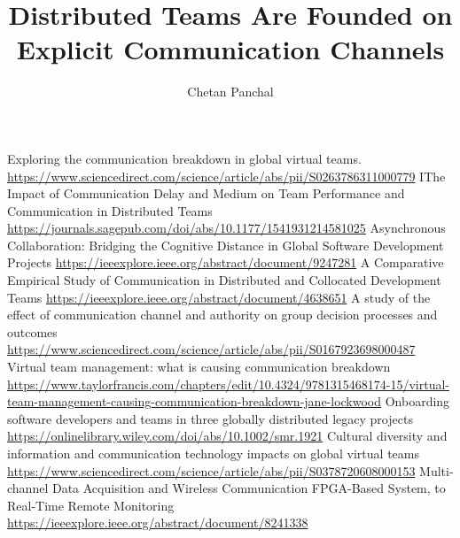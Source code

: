 \documentclass[runningheads]{llncs}
\begin{document}
%
\title{Distributed Teams Are Founded on Explicit
Communication Channels}
%
%
\author{Chetan Panchal}
%

%

%
%
\maketitle              %
%




    \begin{thebibliography}{8}
        Exploring the communication breakdown in global virtual teams. \url{https://www.sciencedirect.com/science/article/abs/pii/S0263786311000779}
        IThe Impact of Communication Delay and Medium on Team Performance and Communication in Distributed Teams \url{https://journals.sagepub.com/doi/abs/10.1177/1541931214581025} 
        Asynchronous Collaboration: Bridging the Cognitive Distance in Global Software Development Projects \url{https://ieeexplore.ieee.org/abstract/document/9247281}
        A Comparative Empirical Study of Communication in Distributed and Collocated Development Teams \url{https://ieeexplore.ieee.org/abstract/document/4638651}
        A study of the effect of communication channel and authority on group decision processes and outcomes \url{https://www.sciencedirect.com/science/article/abs/pii/S0167923698000487}
        Virtual team management: what is causing communication breakdown \url{https://www.taylorfrancis.com/chapters/edit/10.4324/9781315468174-15/virtual-team-management-causing-communication-breakdown-jane-lockwood}
        Onboarding software developers and teams in three globally distributed legacy projects \url{https://onlinelibrary.wiley.com/doi/abs/10.1002/smr.1921}
        Cultural diversity and information and communication technology impacts on global virtual teams \url{https://www.sciencedirect.com/science/article/abs/pii/S0378720608000153}
        Multi-channel Data Acquisition and Wireless Communication FPGA-Based System, to Real-Time Remote Monitoring \url{https://ieeexplore.ieee.org/abstract/document/8241338}
    \end{thebibliography}
    
\end{document}
